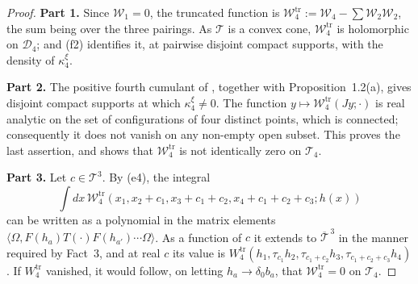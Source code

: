 \documentclass[11pt]{amsart}
\theoremstyle{definition}
\begin{document}
\begin{proof}
\textbf{Part 1.}
Since $\mathcal W_1=0$, the truncated function is $\mathcal W_4^{\mathrm{tr}}:=\allowbreak \mathcal W_4-\sum\mathcal W_2\mathcal W_2$, the sum being over the three pairings.
As $\mathcal T$ is a convex cone, $\mathcal W_4^{\mathrm{tr}}$ is holomorphic on $\mathcal D_4$; and (f2) identifies it, at pairwise disjoint compact supports, with the density of $\kappa_4^\xi$.

\textbf{Part 2.}
The positive fourth cumulant of \cite[Theorem~44(D6)]{QEDIII}, together with Proposition~1.2(a), gives disjoint compact supports at which $\kappa_4^\xi\ne0$.
The function $y\mapsto\mathcal W_4^{\mathrm{tr}}(Jy;\cdot)$ is real analytic on the set of configurations of four distinct points, which is connected; consequently it does not vanish on any non-empty open subset.
This proves the last assertion, and shows that $\mathcal W_4^{\mathrm{tr}}$ is not identically zero on $\mathcal T_4$.

\textbf{Part 3.}
Let $c\in\mathcal T^3$.
By (e4), the integral
\begin{equation*}
\int dx\,\mathcal W_4^{\mathrm{tr}}(x_1,x_2+c_1,x_3+c_1+c_2,x_4+c_1+c_2+c_3;h(x))
\end{equation*}
can be written as a polynomial in the matrix elements $\langle\Omega,F(h_a)T(\cdot)F(h_{a'})\cdots\Omega\rangle$.
As a function of $c$ it extends to $\overline{\mathcal T}^{\,3}$ in the manner required by Fact~3, and at real $c$ its value is $W_4^{\mathrm{tr}}(h_1,\allowbreak \tau_{c_1}h_2,\allowbreak \tau_{c_1+c_2}h_3,\allowbreak \tau_{c_1+c_2+c_3}h_4)$.
If $W_4^{\mathrm{tr}}$ vanished, it would follow, on letting $h_a\to\delta_0b_a$, that $\mathcal W_4^{\mathrm{tr}}=0$ on $\mathcal T_4$.
\end{proof}
\end{document}
